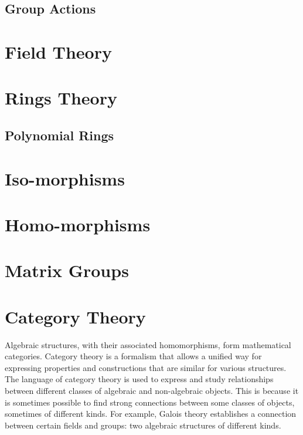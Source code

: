\subsection{Group Actions}

\lipsum[1]
\lipsum[1]
\section{Field Theory}

\section{Rings Theory}
\subsection{Polynomial Rings}

\section{Iso-morphisms}

\section{Homo-morphisms}

\section{Matrix Groups}

\section{Category Theory}

Algebraic structures, with their associated homomorphisms, form mathematical categories. Category theory is a formalism that allows a unified way for expressing properties and constructions that are similar for various structures. \\

The language of category theory is used to express and study relationships between different classes of algebraic and non-algebraic objects. This is because it is sometimes possible to find strong connections between some classes of objects, sometimes of different kinds. For example, Galois theory establishes a connection between certain fields and groups: two algebraic structures of different kinds.\\